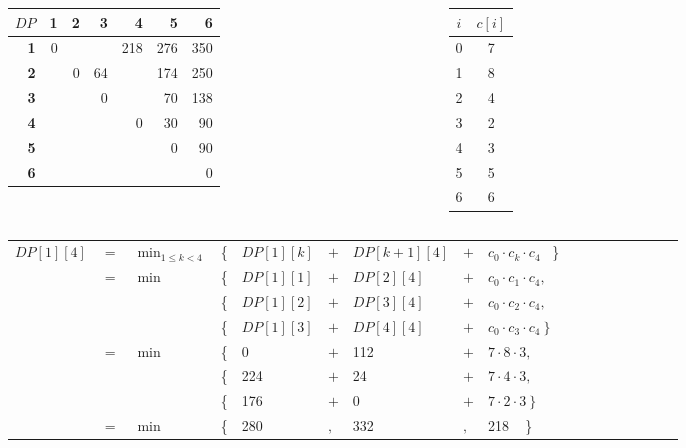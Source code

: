 \begin{frame}{}

\begingroup
\renewcommand*{\arraystretch}{1.0}
\vspace{-6pt}
\begin{columns}[T]
\begin{tabular}{|r|r|r|r|r|r|r|}
\hline
$DP$ &  \textbf{1} & \textbf{2} & \textbf{3} & \textbf{4} & \textbf{5} & \textbf{6} \\\hline
\textbf{1} & \phantom{00}0 & \color{blue}{224} & \color{blue}{176} & \alert{218} & 276 & 350 \\\hline
\textbf{2} &   & 0 & 64 & \color{blue}{112} & 174 & 250 \\\hline
\textbf{3} &   &   & 0 & \color{blue}{24}    & 70 & 138 \\\hline
\textbf{4} &   &   &   & 0 & 30 & 90 \\\hline
\textbf{5} &   &   &   &   & 0 & 90 \\\hline
\textbf{6} &   &   &   &   &   & 0 \\\hline
\end{tabular}
\begin{tabular}{|c|c|}
\hline
$i$ & $c[i]$ \\\hline
0 & 7 \\\hline
1 & 8 \\\hline
2 & 4 \\\hline
3 & 2 \\\hline
4 & 3 \\\hline
5 & 5 \\\hline
6 & 6 \\\hline
\end{tabular}
\end{columns}

\medskip
\setlength{\tabcolsep}{3pt}
\begin{tabular}{lllllllllllllllll}
$DP[1][4]$ & $=$ & $\displaystyle\min_{1 \leq k < 4}$ & \{ & $DP[1][k]$ & $+$ & $DP[k+1][4]$ & $+$ & $c_0 \cdot c_k \cdot c_4$ ~\} \\
        & $=$      & $\min$ & \{ & $DP[1][1]$ & $+$ & $DP[2][4]$ & $+$ & $c_0 \cdot c_1 \cdot c_4,$ \\
         &     &        & \{ & $DP[1][2]$ & $+$ & $DP[3][4]$ & $+$ & $c_0 \cdot c_2 \cdot c_4,$ \\
         &     &        & \{ & $DP[1][3]$ & $+$ & $DP[4][4]$ & $+$ & $c_0 \cdot c_3 \cdot c_4 ~\}$ \\
         &  $=$   & $\min$ & \{ & 0 & $+$ & 112 & $+$ & $7 \cdot 8 \cdot 3,$ \\
          &    &        & \{ & 224  & $+$ & 24 & $+$ & $7 \cdot 4 \cdot 3,$ \\
          &    &        & \{ & 176 & $+$ & 0 & $+$ & $7 \cdot 2 \cdot 3 ~\}$ \\
         &  $=$   & $\min$ & \{ & 280 & $,$ & 332 & $,$ & \alert{218} ~ \} \\
\end{tabular}
\endgroup

\end{frame}


